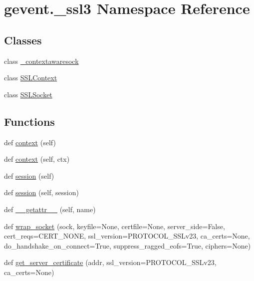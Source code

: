 \hypertarget{namespacegevent_1_1__ssl3}{}\section{gevent.\+\_\+ssl3 Namespace Reference}
\label{namespacegevent_1_1__ssl3}
\subsection*{Classes}
\begin{DoxyCompactItemize}
\item 
class \hyperlink{classgevent_1_1__ssl3_1_1__contextawaresock}{\+\_\+contextawaresock}
\item 
class \hyperlink{classgevent_1_1__ssl3_1_1_s_s_l_context}{S\+S\+L\+Context}
\item 
class \hyperlink{classgevent_1_1__ssl3_1_1_s_s_l_socket}{S\+S\+L\+Socket}
\end{DoxyCompactItemize}
\subsection*{Functions}
\begin{DoxyCompactItemize}
\item 
def \hyperlink{namespacegevent_1_1__ssl3_add9cd88d182d4133bb7c0b2d44ece79d}{context} (self)
\item 
def \hyperlink{namespacegevent_1_1__ssl3_aa2a4f272f8d13968e6b9b4cf9a0761b7}{context} (self, ctx)
\item 
def \hyperlink{namespacegevent_1_1__ssl3_a88a40f6db85f505af09e2da9cf72c088}{session} (self)
\item 
def \hyperlink{namespacegevent_1_1__ssl3_a00647338146e56cb2cad9838a1c60826}{session} (self, session)
\item 
def \hyperlink{namespacegevent_1_1__ssl3_a4981cd66ced9a108f4369b8f23264d9e}{\+\_\+\+\_\+getattr\+\_\+\+\_\+} (self, name)
\item 
def \hyperlink{namespacegevent_1_1__ssl3_a49b27528d72dbbd67fb256e20a78750c}{wrap\+\_\+socket} (sock, keyfile=None, certfile=None, server\+\_\+side=False, cert\+\_\+reqs=C\+E\+R\+T\+\_\+\+N\+O\+NE, ssl\+\_\+version=P\+R\+O\+T\+O\+C\+O\+L\+\_\+\+S\+S\+Lv23, ca\+\_\+certs=None, do\+\_\+handshake\+\_\+on\+\_\+connect=True, suppress\+\_\+ragged\+\_\+eofs=True, ciphers=None)
\item 
def \hyperlink{namespacegevent_1_1__ssl3_aa2f28712a446a9d6e1a9eb668cb6e8d5}{get\+\_\+server\+\_\+certificate} (addr, ssl\+\_\+version=P\+R\+O\+T\+O\+C\+O\+L\+\_\+\+S\+S\+Lv23, ca\+\_\+certs=None)
\end{DoxyCompactItemize}
